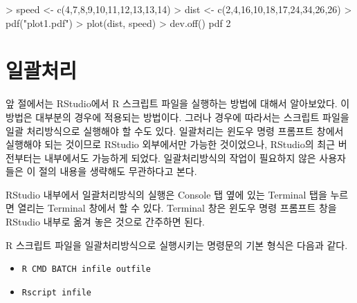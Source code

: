 \documentclass[
]{book}
\newenvironment{Shaded}{\begin{snugshade}}{\end{snugshade}}
\newcommand{\DecValTok}[1]{\textcolor[rgb]{0.00,0.00,0.81}{#1}}
\newcommand{\FunctionTok}[1]{\textcolor[rgb]{0.00,0.00,0.00}{#1}}
\newcommand{\NormalTok}[1]{#1}
\newcommand{\OtherTok}[1]{\textcolor[rgb]{0.56,0.35,0.01}{#1}}
\newcommand{\SpecialCharTok}[1]{\textcolor[rgb]{0.00,0.00,0.00}{#1}}
\newcommand{\StringTok}[1]{\textcolor[rgb]{0.31,0.60,0.02}{#1}}
\begin{document}
\begin{Shaded}
\begin{Highlighting}[]
\SpecialCharTok{\textgreater{}}\NormalTok{ speed }\OtherTok{\textless{}{-}} \FunctionTok{c}\NormalTok{(}\DecValTok{4}\NormalTok{,}\DecValTok{7}\NormalTok{,}\DecValTok{8}\NormalTok{,}\DecValTok{9}\NormalTok{,}\DecValTok{10}\NormalTok{,}\DecValTok{11}\NormalTok{,}\DecValTok{12}\NormalTok{,}\DecValTok{13}\NormalTok{,}\DecValTok{13}\NormalTok{,}\DecValTok{14}\NormalTok{)}
\SpecialCharTok{\textgreater{}}\NormalTok{ dist }\OtherTok{\textless{}{-}} \FunctionTok{c}\NormalTok{(}\DecValTok{2}\NormalTok{,}\DecValTok{4}\NormalTok{,}\DecValTok{16}\NormalTok{,}\DecValTok{10}\NormalTok{,}\DecValTok{18}\NormalTok{,}\DecValTok{17}\NormalTok{,}\DecValTok{24}\NormalTok{,}\DecValTok{34}\NormalTok{,}\DecValTok{26}\NormalTok{,}\DecValTok{26}\NormalTok{)}
\SpecialCharTok{\textgreater{}} \FunctionTok{pdf}\NormalTok{(}\StringTok{"plot1.pdf"}\NormalTok{)}
\SpecialCharTok{\textgreater{}} \FunctionTok{plot}\NormalTok{(dist, speed)}
\SpecialCharTok{\textgreater{}} \FunctionTok{dev.off}\NormalTok{()}
\NormalTok{pdf }
  \DecValTok{2} 
\end{Highlighting}
\end{Shaded}

\hypertarget{section-batch}{%
\section{일괄처리}\label{section-batch}}

앞 절에서는 RStudio에서 R 스크립트 파일을 실행하는 방법에 대해서
알아보았다. 이 방법은 대부분의 경우에 적용되는 방법이다. 그러나 경우에
따라서는 스크립트 파일을 일괄 처리방식으로 실행해야 할 수도 있다.
일괄처리는 윈도우 명령 프롬프트 창에서 실행해야 되는 것이므로 RStudio
외부에서만 가능한 것이었으나, RStudio의 최근 버전부터는 내부에서도
가능하게 되었다. 일괄처리방식의 작업이 필요하지 않은 사용자들은 이 절의
내용을 생략해도 무관하다고 본다.

RStudio 내부에서 일괄처리방식의 실행은 Console 탭 옆에 있는 Terminal
탭을 누르면 열리는 Terminal 창에서 할 수 있다. Terminal 창은 윈도우 명령
프롬프트 창을 RStudio 내부로 옮겨 놓은 것으로 간주하면 된다.

R 스크립트 파일을 일괄처리방식으로 실행시키는 명령문의 기본 형식은
다음과 같다.

\begin{itemize}
\item
  \texttt{R\ CMD\ BATCH\ infile\ outfile}
\item
  \texttt{Rscript\ infile}
\end{itemize}
\end{document}
